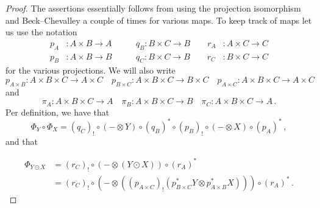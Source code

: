 \documentclass[10pt,a4paper]{amsart}
\begin{document}
\begin{proof}
  The assertions essentially follows from using the projection isomorphism and Beck--Chevalley a couple of times for various maps.
  To keep track of maps let us use the notation
  \begin{equation*}
  \begin{aligned}
  p_A &: A \times B \to A \quad \quad  &q_B: B \times C \to B \quad \quad r_{A} &: A \times C \to C \\
  p_B &: A \times B \to B  \quad \quad &q_C: B\times C \to B \quad \quad  r_C &: B \times C \to C
  \end{aligned}
  \end{equation*}
  for the various projections. We will also write
  \[
  p_{A \times B} : A \times B \times C \to A \times C \quad p_{B \times C} : A \times B \times C \to B \times C \quad p_{A \times C} : A \times B \times C \to A \times C
  \]
  and
  \[
  \pi_{A} : A \times B \times C \to A \quad \pi_{B} : A \times B \times C \to B \quad \pi_{C} : A \times B \times C \to A \,.
  \]
  Per definition, we have that
  \[
  \Phi_Y \circ \Phi_X = (q_C)_! \circ (-\otimes Y) \circ (q_B)^* \circ (p_B)_! \circ (- \otimes X) \circ (p_A)^*  \,,
  \]
  and that

  \begin{align*}
  \Phi_{Y \odot X}& = (r_{C})_! \circ (- \otimes (Y \odot X)) \circ (r_A)^* \\
  &= (r_{C})_! \circ (- \otimes ((p_{A \times C})_!(p^*_{B \times C} Y \otimes p_{A \times B}^* X))) \circ (r_A)^* \,.
\end{align*}


\end{proof}
\end{document}
